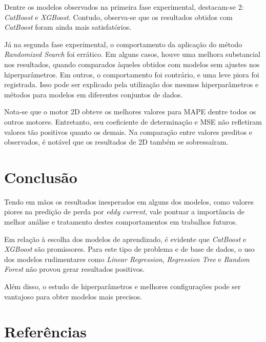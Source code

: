 \documentclass{article}
\begin{document}
Dentre os modelos observados na primeira fase experimental, destacam-se 2: \textit{CatBoost} e \textit{XGBoost}. Contudo, observa-se que os resultados obtidos com \textit{CatBoost} foram ainda mais satisfatórios.

Já na segunda fase experimental, o comportamento da aplicação do método \textit{Randomized Search} foi errático. Em alguns casos, houve uma melhora substancial nos resultados, quando comparados àqueles obtidos com modelos sem ajustes nos hiperparâmetros. Em outros, o comportamento foi contrário, e uma leve piora foi registrada. Isso pode ser explicado pela utilização dos mesmos hiperparâmetros e métodos para modelos em diferentes conjuntos de dados.

Nota-se que o motor 2D obteve os melhores valores para MAPE dentre todos os outros motores. Entretanto, seu coeficiente de determinação e MSE não refletiram valores tão positivos quanto os demais. Na comparação entre valores preditos e observados, é notável que os resultados de 2D também se sobressaíram.

\section{Conclusão}

Tendo em mãos os resultados inesperados em alguns dos modelos, como valores piores na predição de perda por \textit{eddy current}, vale pontuar a importância de melhor análise e tratamento destes comportamentos em trabalhos futuros.

Em relação à escolha dos modelos de aprendizado, é evidente que \textit{CatBoost} e \textit{XGBoost} são promissores. Para este tipo de problema e de base de dados, o uso dos modelos rudimentares como \textit{Linear Regression}, \textit{Regression Tree} e \textit{Random Forest} não provou gerar resultados positivos.

Além disso, o estudo de hiperparâmetros e melhores configurações pode ser vantajoso para obter modelos mais precisos.

\newpage
\section{Referências}
\end{document}
